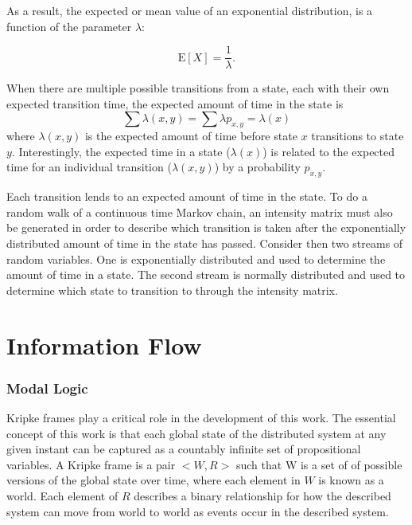 As a result, the expected or mean value of an exponential distribution, is a function of
the parameter $\lambda$: \cite{MARKOV1}

\begin{equation}
\mathrm{E}[X] = \frac{1}{\lambda}. \!
\end{equation}

When there are multiple possible transitions from a state, each with their own expected transition time, the expected amount of time in the state is \cite{MARKOV2}
\begin{equation}
\sum \lambda(x,y) = \sum \lambda p_{x,y} = \lambda(x)
\end{equation}
where $\lambda(x,y)$ is the expected amount of time before state $x$ transitions to state $y$.
Interestingly, the expected time in a state ($\lambda(x)$) is related to the expected time for an individual transition ($\lambda(x,y)$) by a probability $p_{x,y}$.

Each transition lends to an expected amount of time in the state.
To do a random walk of a continuous time Markov chain, an intensity matrix must also be generated in order to describe which transition is taken after the exponentially distributed amount of time in the state has passed.
Consider then two streams of random variables.
One is exponentially distributed and used to determine the amount of time in a state.
The second stream is normally distributed and used to determine which state to transition to through the intensity matrix.

\section{Information Flow}

\subsubsection{Modal Logic}

Kripke frames\cite{kripke1959}\cite{blackburn2002modal} play a critical role in the development of this work. The essential concept of this work is that each global state of the distributed system at any given instant can be captured as a countably infinite set of propositional variables. A Kripke frame is a pair $<W,R>$\cite{french2006} such that W is a set of of possible versions of the global state over time, where each element in $W$ is known as a world. Each element of $R$ describes a binary relationship for how the described system can move from world to world as events occur in the described system.

